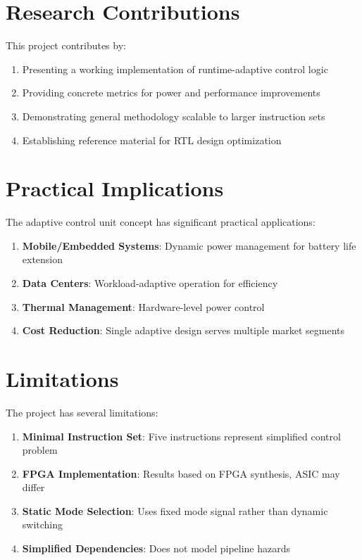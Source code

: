 \documentclass[15pt,a4paper]{report}
\begin{document}
\section{Research Contributions}

This project contributes by:

\begin{enumerate}
    \item Presenting a working implementation of runtime-adaptive control logic
    \item Providing concrete metrics for power and performance improvements
    \item Demonstrating general methodology scalable to larger instruction sets
    \item Establishing reference material for RTL design optimization
\end{enumerate}

\section{Practical Implications}

The adaptive control unit concept has significant practical applications:

\begin{enumerate}
    \item \textbf{Mobile/Embedded Systems}: Dynamic power management for battery life extension
    
    \item \textbf{Data Centers}: Workload-adaptive operation for efficiency
    
    \item \textbf{Thermal Management}: Hardware-level power control
    
    \item \textbf{Cost Reduction}: Single adaptive design serves multiple market segments
\end{enumerate}

\section{Limitations}

The project has several limitations:

\begin{enumerate}
    \item \textbf{Minimal Instruction Set}: Five instructions represent simplified control problem
    
    \item \textbf{FPGA Implementation}: Results based on FPGA synthesis, ASIC may differ
    
    \item \textbf{Static Mode Selection}: Uses fixed mode signal rather than dynamic switching
    
    \item \textbf{Simplified Dependencies}: Does not model pipeline hazards
\end{enumerate}
\end{document}
